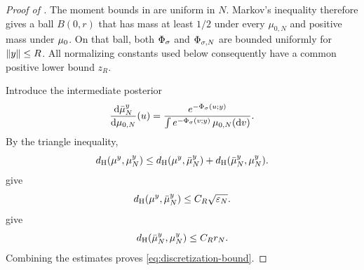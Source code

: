 \begin{proof}[Proof of ]
The moment bounds in  are uniform in $N$.
Markov's inequality therefore gives a ball $B(0,r)$ that has mass at
least $1/2$ under every $\mu_{0,N}$ and positive mass under ${\mu_{0}}$.
On that ball, both $\Phi_{\sigma}$ and
$\Phi_{\sigma,N}$ are bounded uniformly for $\left\lVert y\right\rVert\leq R$.
All normalizing constants used below consequently have a common
positive lower bound $z_R$.

Introduce the intermediate posterior
\[
  \frac{\mathrm d\bar\mu_N^y}{\mathrm d\mu_{0,N}}(u)
  =
  \frac{e^{-\Phi_{\sigma}(u;y)}}
       {\int e^{-\Phi_{\sigma}(v;y)}\,\mu_{0,N}(\mathrm dv)}.
\]
By the triangle inequality,
\[
  {d_{\mathrm{H}}}({\mu^{y}},{\mu^{y}_{N}})
  \leq{d_{\mathrm{H}}}({\mu^{y}},\bar\mu_N^y)
      +{d_{\mathrm{H}}}(\bar\mu_N^y,{\mu^{y}_{N}}).
\]
 give
\[
  {d_{\mathrm{H}}}({\mu^{y}},\bar\mu_N^y)
  \leq C_R\sqrt{\varepsilon_N}.
\]
 give
\[
  {d_{\mathrm{H}}}(\bar\mu_N^y,{\mu^{y}_{N}})\leq C_R r_N.
\]
Combining the estimates proves
\eqref{eq:discretization-bound}.
\end{proof}
